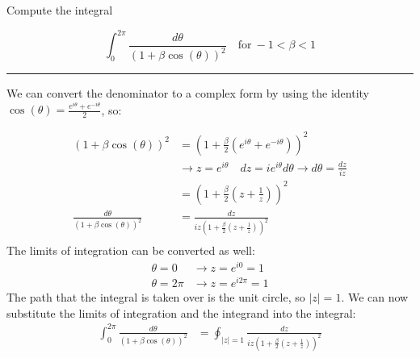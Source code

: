\begin{example}

    Compute the integral

    $$\int_0^{2\pi}\frac{d\theta}{(1+\beta\cos(\theta))^2}\quad\mathrm{for~}-1<\beta<1$$

    \hrule
    \vspace{0.5cm}

    We can convert the denominator to a complex form by using the identity $\cos(\theta) = \frac{e^{i\theta} + e^{-i\theta}}{2}$, so:

    \begin{align*}
        (1 + \beta\cos(\theta))^2               & = (1 + \frac{\beta}{2}(e^{i\theta} + e^{-i\theta}))^2                                            \\
                                                & \rightarrow z = e^{i\theta} \quad dz = i e^{i\theta} d\theta \rightarrow d\theta = \frac{dz}{iz} \\
                                                & = (1 + \frac{\beta}{2}(z + \frac{1}{z}))^2                                                       \\
        \frac{d\theta}{(1+\beta\cos(\theta))^2} & = \frac{dz}{iz(1 + \frac{\beta}{2}(z + \frac{1}{z}))^{2}}                                        \\
    \end{align*}
    The limits of integration can be converted as well:
    \begin{align*}
        \theta = 0    & \rightarrow z = e^{i0} = 1    \\
        \theta = 2\pi & \rightarrow z = e^{i2\pi} = 1
    \end{align*}
    The path that the integral is taken over is the unit circle, so $|z| = 1$. We can now substitute the limits of integration and the integrand into the integral:
    \begin{align*}
        \int_0^{2\pi}\frac{d\theta}{(1+\beta\cos(\theta))^2} & = \oint_{|z|=1} \frac{dz}{iz(1 + \frac{\beta}{2}(z + \frac{1}{z}))^{2}}
    \end{align*}


\end{example}
